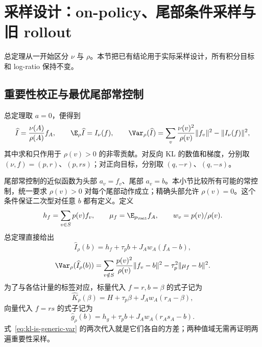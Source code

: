 \section{采样设计：on-policy、尾部条件采样与旧 rollout}
\label{sec:kl-sampling}

总定理从一开始区分 $\nu$ 与 $\rho$。本节把已有结论用于实际采样设计，所有积分目标和 log-ratio 保持不变。

\subsection{重要性校正与最优尾部常控制}
\begin{corollary}[直接重要性采样]\label{thm:kl-importance}
总定理取 $a=0$，便得到
\[
 \widehat I=\frac{\nu(A)}{\rho(A)}f_A,\qquad
 \E_\rho\widehat I=I_\nu(f),\qquad
 \Var_\rho(\widehat I)
 =\sum_v\frac{\nu(v)^2}{\rho(v)}\|f_v\|^2-\|I_\nu(f)\|^2,
\]
其中求和只作用于 $\rho(v)>0$ 的非零贡献。对反向 KL 的数值和梯度，分别取 $(\nu,f)=(p,r)$、$(p,rs)$；对正向目标，分别取 $(q,-r)$、$(q,-s)$。
\end{corollary}

尾部常控制的近似函数为头部 $a_v=f_v$、尾部 $a_v=b$。本小节比较所有可能的常控制，统一要求 $\rho(v)>0$ 对每个尾部动作成立；精确头部允许 $\rho(v)=0$。这个条件保证二次型对任意 $b$ 都有定义。定义
\[
 h_f=\sum_{v\in S}p(v)f_v,\qquad
 \mu_f=\E_{p_\tail}f_A,\qquad w_v=p(v)/\rho(v).
\]
总定理直接给出
\begin{equation}\label{eq:kl-is-generic}
 \widehat I_\rho(b)=h_f+\tau_pb+J_Aw_A(f_A-b),
\end{equation}
\begin{equation}\label{eq:kl-is-generic-var}
 \Var_\rho(\widehat I_\rho(b))
 =\sum_{v\notin S}\frac{p(v)^2}{\rho(v)}\|f_v-b\|^2
   -\tau_p^2\|\mu_f-b\|^2.
\end{equation}
为了与各估计量的标签对应，标量代入 $f=r,b=\beta$ 的式子记为
\begin{equation}\label{eq:kl-is-scalar}
 \widehat K_\rho(\beta)=H+\tau_p\beta+J_Aw_A(r_A-\beta),
\end{equation}
向量代入 $f=rs$ 的式子记为
\begin{equation}\label{eq:kl-is-vector}
 \widehat g_\rho(b)=h_g+\tau_pb+J_Aw_A(r_As_A-b).
\end{equation}
式~\eqref{eq:kl-is-generic-var} 的两次代入就是它们各自的方差；两种值域无需再证明两遍重要性采样。

